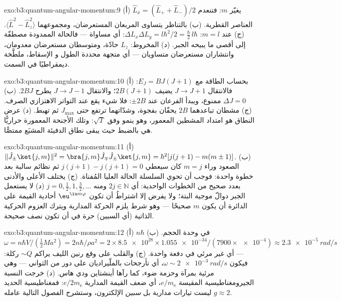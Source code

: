 \begin{solution}{exo:b3:quantum-angular-momentum:9}
(أ) $\hat L_x = (\hat L_+ + \hat L_-)/2$ يغيّر $m$: فتنعدم العناصر
القطرية. (ب) بالتناظر يتساوى المربعان المستعرضان،
ومجموعهما $\langle\hat L^2 - \hat L_z^2\rangle$. (ج)
عند $m = l$: $\Delta L_x\Delta L_y = l\hbar^2/2 = \tfrac\hbar2
\,l\hbar$: أي مساواة --- فالحالة الممدودة مصطفّة إلى أقصى ما
يبيحه الجبر. (د) المخروط: $L_z$ حادّة، ومتوسطان مستعرضان
معدومان، وانتشاران مستعرضان متساويان --- أي متجهة محددة الطول و
الإسقاط، ملطَّخة ديمقراطيًا في السمت.
\end{solution}

\begin{solution}{exo:b3:quantum-angular-momentum:10}
(أ) بحساب الطاقة مع $E_J = BJ(J+1)$: فالانتقال $J \to J + 1$ يضيف
$2B(J+1)$؛ والانتقال $J \to J - 1$ يطرح $2BJ$. (ب) $\Delta J = 0$
ممنوع، ويبدأ الفرعان عند $\pm 2B$: فلا شيء يقع عند
التواتر الاهتزازي الصرف. (ج) مشطان تباعدهما $2B$
يحفّان بفجوة، وشدّاتهما ترتفع حتى $J_{\max}$ ثم تهبط. (د)
عرض النطاق هو امتداد المشطين المعمور، وهو ينمو وفق
$\sqrt{T}$: وتلك الأجنحة المعمورة حراريًّا هي بالضبط حيث يبقى
نطاق الدفيئة المشبَع ممتصًّا.
\end{solution}

\begin{solution}{exo:b3:quantum-angular-momentum:11}
(أ) $\|\hat J_\pm\ket{j,m}\|^2 = \bra{j,m}\hat J_\mp\hat J_\pm
\ket{j,m} = \hbar^2[j(j+1) - m(m\pm1)]$. (ب) الصعود وراء $m = j$
كان سيعطي $j(j+1) - j(j+1) = 0$ ثم نظائم سالبة بعد خطوة
واحدة: فوجب أن تحوي السلسلة الحالة العليا المُفناة. (ج)
يختلف الأعلى والأدنى بعدد صحيح من الخطوات الواحدية: أي $2j \in
\mathbb N$ ومنه $j = 0, \tfrac12, 1, \tfrac32, \dots$ (د) لا يستعمل الجبر
دوالّ موجية البتة؛ ولا يفرض إلا اشتراطُ أن تكون
$\eu^{\iu m\varphi}$ أحادية القيمة على الدائرة أن يكون $m$ صحيحًا
--- وهو شرط يلزم الحركة المدارية ويترك العزوم الحركية
الذاتية (أي السبين) حرة في أن تكون نصف صحيحة.
\end{solution}

\begin{solution}{exo:b3:quantum-angular-momentum:12}
(أ) $n\hbar$ في وحدة الحجم. (ب) $\omega = n\hbar V/(\tfrac12 Ma^2)
= 2n\hbar/\rho a^2 = 2 \times \num{8.5e28} \times \num{1.055e-34}/
(7900 \times \num{e-4}) \approx \qty{2.3e-5}{rad/s}$ --- أي غير مرئي
في دفعة واحدة. (ج) والقلب على وقع رنين الليف
يراكم $\sim Q$ ركلة: فيكون $\omega \sim \qty{2e-3}{rad/s}$،
أي تأرجحات بالملّيراديان على دور من الثواني --- وهي مرئية بمرآة
وحزمة ضوء، كما رآها أينشتاين ودي هاس. (د) خرجت النسبة
الجيرومغناطيسية المقيسة $e/m_{\text{e}}$، أي ضعف القيمة المدارية
$e/2m_{\text{e}}$: فمغناطيسية الحديد ليست تيارات مدارية بل
\emph{سبين} الإلكترون، وستشرح الفصول التالية عامله $g \approx 2$.
\end{solution}

